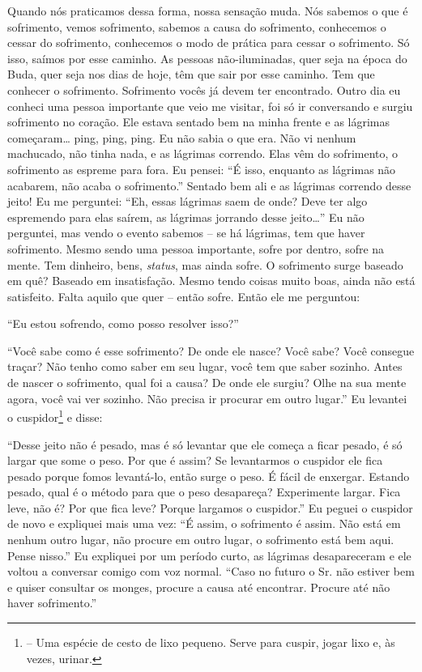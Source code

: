 Quando nós praticamos dessa forma, nossa sensação muda. Nós sabemos
o que é sofrimento, vemos sofrimento, sabemos a causa do sofrimento,
conhecemos o cessar do sofrimento, conhecemos o modo de prática para
cessar o sofrimento. Só isso, saímos por esse caminho. As pessoas
não-iluminadas, quer seja na época do Buda, quer seja nos dias de hoje,
têm que sair por esse caminho. Tem que conhecer o sofrimento.
Sofrimento vocês já devem ter encontrado. Outro dia eu conheci uma
pessoa importante que veio me visitar, foi só ir conversando e surgiu
sofrimento no coração. Ele estava sentado bem na minha frente e as
lágrimas começaram… ping, ping, ping. Eu não sabia o que era. Não vi
nenhum machucado, não tinha nada, e as lágrimas correndo. Elas vêm do
sofrimento, o sofrimento as espreme para fora. Eu pensei: “É isso,
enquanto as lágrimas não acabarem, não acaba o sofrimento.” Sentado bem
ali e as lágrimas correndo desse jeito! Eu me perguntei: “Eh, essas
lágrimas saem de onde? Deve ter algo espremendo para elas saírem, as
lágrimas jorrando desse jeito…” Eu não perguntei, mas vendo o evento
sabemos – se há lágrimas, tem que haver sofrimento.
Mesmo sendo uma pessoa importante, sofre por dentro, sofre na mente.
Tem dinheiro, bens, \textit{status}, mas ainda sofre. O sofrimento
surge baseado em quê? Baseado em insatisfação. Mesmo tendo coisas muito
boas, ainda não está satisfeito. Falta aquilo que quer
– então sofre. Então ele me perguntou: 

“Eu estou sofrendo, como posso resolver isso?” 

“Você sabe como é esse sofrimento? De onde ele nasce? Você sabe?
Você consegue traçar? Não tenho como saber em seu lugar, você tem que
saber sozinho. Antes de nascer o sofrimento, qual foi a causa? De onde
ele surgiu? Olhe na sua mente agora, você vai ver sozinho. Não precisa
ir procurar em outro lugar.” Eu levantei o
cuspidor\footnote{ – Uma espécie de
cesto de lixo pequeno. Serve para cuspir, jogar lixo e, às vezes,
urinar.} e disse: 

“Desse jeito não é pesado, mas é só levantar que ele começa a ficar
pesado, é só largar que some o peso. Por que é assim? Se levantarmos o
cuspidor ele fica pesado porque fomos levantá-lo, então surge o peso. É
fácil de enxergar. Estando pesado, qual é o método para que o peso
desapareça? Experimente largar. Fica leve, não é? Por que fica leve?
Porque largamos o cuspidor.” Eu peguei o cuspidor de novo e expliquei
mais uma vez: “É assim, o sofrimento é assim. Não está em nenhum outro
lugar, não procure em outro lugar, o sofrimento está bem aqui. Pense
nisso.” Eu expliquei por um período curto, as lágrimas desapareceram e
ele voltou a conversar comigo com voz normal. “Caso no futuro o Sr. não
estiver bem e quiser consultar os monges, procure a causa até
encontrar. Procure até não haver sofrimento.”

